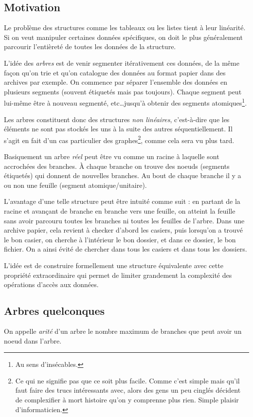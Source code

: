 \documentclass[../../../main.tex]{subfiles}
\begin{document}
\subsection{Motivation}
Le problème des structures comme les tableaux ou les listes tient à leur linéarité. Si on veut manipuler certaines données spécifiques, on doit le plus généralement parcourir l'entièreté de toutes les données de la structure.

L'idée des \textit{arbres} est de venir segmenter itérativement ces données, de la même façon qu'on trie et qu'on catalogue des données au format papier dans des archives par exemple. On commence par séparer l'ensemble des données en plusieurs segments (souvent étiquetés mais pas toujours). Chaque segment peut lui-même être à nouveau segmenté, etc\dots jusqu'à obtenir des segments atomiques\footnote{Au sens d'insécables.}.

Les arbres constituent donc des structures \textit{non linéaires}, c'est-à-dire que les éléments ne sont pas stockés les uns à la suite des autres séquentiellement. Il s'agit en fait d'un cas particulier des graphes\footnote{Ce qui ne signifie pas que ce soit plus facile. Comme c'est simple mais qu'il faut faire des trucs intéressants avec, alors des gens un peu cinglés décident de complexifier à mort histoire qu'on y comprenne plus rien. Simple plaisir d'informaticien.}, comme cela sera vu plus tard.

Basiquement un arbre \textit{réel} peut être vu comme un racine à laquelle sont accrochées des branches. À chaque branche on trouve des noeuds (segments étiquetés) qui donnent de nouvelles branches. Au bout de chaque branche il y a ou non une feuille (segment atomique/unitaire).

L'avantage d'une telle structure peut être intuité comme suit : en partant de la racine et avançant de branche en branche vers une feuille, on atteint la feuille sans avoir parcouru toutes les branches ni toutes les feuilles de l'arbre. Dans une archive papier, cela revient à checker d'abord les casiers, puis lorsqu'on a trouvé le bon casier, on cherche à l'intérieur le bon dossier, et dans ce dossier, le bon fichier. On a ainsi évité de chercher dans tous les casiers et dans tous les dossiers.

L'idée est de construire formellement une structure équivalente avec cette propriété extraordinaire qui permet de limiter grandement la complexité des opérations d'accès aux données.
\subsection{Arbres quelconques}
On appelle \textit{arité} d'un arbre le nombre maximum de branches que peut avoir un noeud dans l'arbre.
\end{document}
